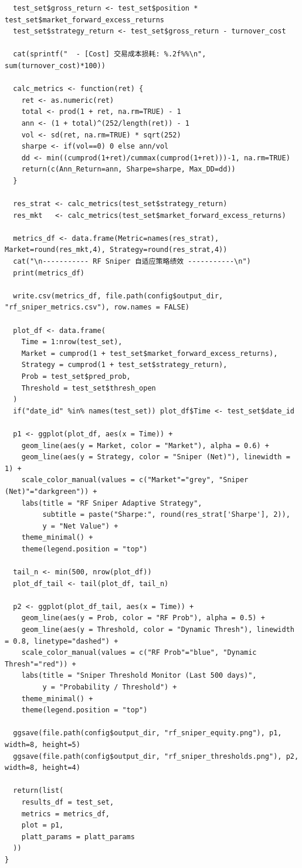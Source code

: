 \documentclass[11pt, a4paper]{article}
\begin{document}
\begin{verbatim}
  test_set$gross_return <- test_set$position * test_set$market_forward_excess_returns
  test_set$strategy_return <- test_set$gross_return - turnover_cost
  
  cat(sprintf("  - [Cost] 交易成本损耗: %.2f%%\n", sum(turnover_cost)*100))
  
  calc_metrics <- function(ret) {
    ret <- as.numeric(ret)
    total <- prod(1 + ret, na.rm=TRUE) - 1
    ann <- (1 + total)^(252/length(ret)) - 1
    vol <- sd(ret, na.rm=TRUE) * sqrt(252)
    sharpe <- if(vol==0) 0 else ann/vol
    dd <- min((cumprod(1+ret)/cummax(cumprod(1+ret)))-1, na.rm=TRUE)
    return(c(Ann_Return=ann, Sharpe=sharpe, Max_DD=dd))
  }
  
  res_strat <- calc_metrics(test_set$strategy_return)
  res_mkt   <- calc_metrics(test_set$market_forward_excess_returns)
  
  metrics_df <- data.frame(Metric=names(res_strat), Market=round(res_mkt,4), Strategy=round(res_strat,4))
  cat("\n----------- RF Sniper 自适应策略绩效 -----------\n")
  print(metrics_df)
  
  write.csv(metrics_df, file.path(config$output_dir, "rf_sniper_metrics.csv"), row.names = FALSE)
  
  plot_df <- data.frame(
    Time = 1:nrow(test_set),
    Market = cumprod(1 + test_set$market_forward_excess_returns),
    Strategy = cumprod(1 + test_set$strategy_return),
    Prob = test_set$pred_prob,
    Threshold = test_set$thresh_open
  )
  if("date_id" %in% names(test_set)) plot_df$Time <- test_set$date_id
  
  p1 <- ggplot(plot_df, aes(x = Time)) +
    geom_line(aes(y = Market, color = "Market"), alpha = 0.6) +
    geom_line(aes(y = Strategy, color = "Sniper (Net)"), linewidth = 1) +
    scale_color_manual(values = c("Market"="grey", "Sniper (Net)"="darkgreen")) +
    labs(title = "RF Sniper Adaptive Strategy",
         subtitle = paste("Sharpe:", round(res_strat['Sharpe'], 2)),
         y = "Net Value") +
    theme_minimal() +
    theme(legend.position = "top")
  
  tail_n <- min(500, nrow(plot_df))
  plot_df_tail <- tail(plot_df, tail_n)
  
  p2 <- ggplot(plot_df_tail, aes(x = Time)) +
    geom_line(aes(y = Prob, color = "RF Prob"), alpha = 0.5) +
    geom_line(aes(y = Threshold, color = "Dynamic Thresh"), linewidth = 0.8, linetype="dashed") +
    scale_color_manual(values = c("RF Prob"="blue", "Dynamic Thresh"="red")) +
    labs(title = "Sniper Threshold Monitor (Last 500 days)",
         y = "Probability / Threshold") +
    theme_minimal() +
    theme(legend.position = "top")
  
  ggsave(file.path(config$output_dir, "rf_sniper_equity.png"), p1, width=8, height=5)
  ggsave(file.path(config$output_dir, "rf_sniper_thresholds.png"), p2, width=8, height=4)
  
  return(list(
    results_df = test_set, 
    metrics = metrics_df, 
    plot = p1,
    platt_params = platt_params
  ))
}
\end{verbatim}
\end{document}
